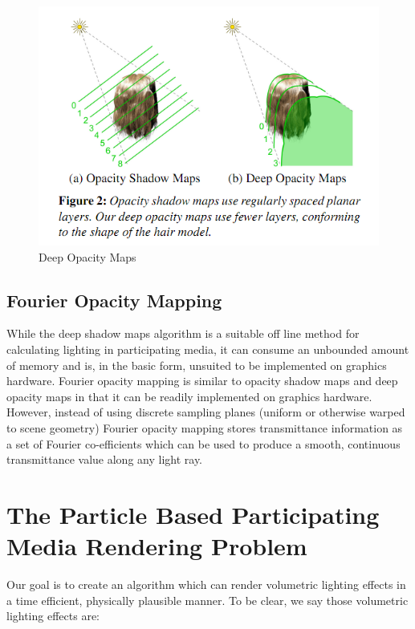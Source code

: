 \documentclass{article}
\begin{document}
\begin{figure}[h!]
	\centering
	\includegraphics[scale=0.5]{Images/DeepOpacityMaps}
	\caption{Deep Opacity Maps}
\end{figure}

\subsection{Fourier Opacity Mapping}

While the deep shadow maps algorithm is a suitable off line method for calculating lighting in participating media, it can consume an unbounded amount of memory and is, in the basic form, unsuited to be implemented on graphics hardware. Fourier opacity mapping \cite{Jansen:2010:FOM:1730804.1730831} is similar to opacity shadow maps and deep opacity maps in that it can be readily implemented on graphics hardware. However, instead of using discrete sampling planes (uniform or otherwise warped to scene geometry) Fourier opacity mapping stores transmittance information as a set of Fourier co-efficients which can be used to produce a smooth, continuous transmittance value along any light ray. 

\section{The Particle Based Participating Media Rendering Problem}

Our goal is to create an algorithm which can render volumetric lighting effects in a time efficient, physically plausible manner. To be clear, we say those volumetric lighting effects are:
\end{document}
